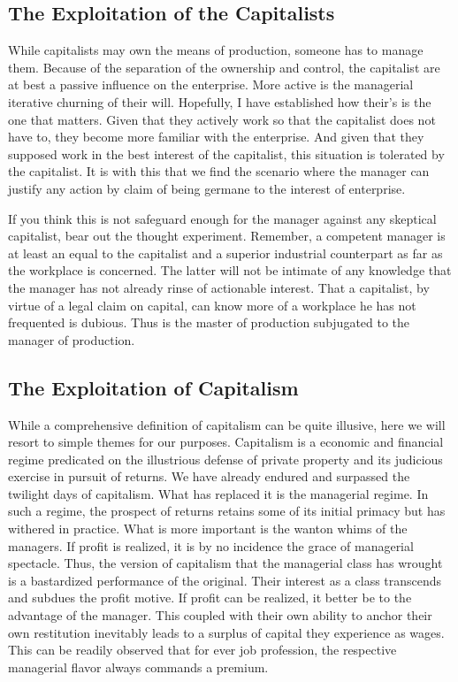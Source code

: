 \documentclass[12pt]{article}
\begin{document}
\subsection{The Exploitation of the Capitalists}
While capitalists may own the means of production, someone has to manage them.
Because of the separation of the ownership and control, the capitalist are at best a passive influence on the enterprise.
More active is the managerial iterative churning of their will.
Hopefully, I have established how their's is the one that matters.
Given that they actively work so that the capitalist does not have to, they become more familiar with the enterprise.
And given that they supposed work in the best interest of the capitalist, this situation is tolerated by the capitalist.
It is with this that we find the scenario where the manager can justify any action by claim of being germane to the interest of enterprise.

If you think this is not safeguard enough for the manager against any skeptical capitalist, bear out the thought experiment.
Remember, a competent manager is at least an equal to the capitalist and a superior industrial counterpart as far as the workplace is concerned.
The latter will not be intimate of any knowledge that the manager has not already rinse of actionable interest.
That a capitalist, by virtue of a legal claim on capital, can know more of a workplace he has not frequented is dubious.
Thus is the master of production subjugated to the manager of production.

\subsection{The Exploitation of Capitalism}
While a comprehensive definition of capitalism can be quite illusive, here we will resort to simple themes for our purposes.
Capitalism is a economic and financial regime predicated on the illustrious defense of private property and its judicious exercise in pursuit of returns.
We have already endured and surpassed the twilight days of capitalism.
What has replaced it is the managerial regime.
In such a regime, the prospect of returns retains some of its initial primacy but has withered in practice.
What is more important is the wanton whims of the managers.
If profit is realized, it is by no incidence the grace of managerial spectacle.
Thus, the version of capitalism that the managerial class has wrought is a bastardized performance of the original.
Their interest as a class transcends and subdues the profit motive.
If profit can be realized, it better be to the advantage of the manager.
This coupled with their own ability to anchor their own restitution inevitably leads to a surplus of capital they experience as wages.
This can be readily observed that for ever job profession, the respective managerial flavor always commands a premium.
\end{document}
